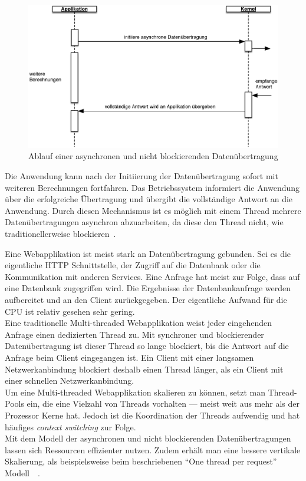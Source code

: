 \begin{figure}[H]
 \centering
 \includegraphics[width=1.0\textwidth]{4-Hauptteil/async-io/async-io.eps}
 \caption{Ablauf einer asynchronen und nicht blockierenden Datenübertragung}
 \label{fig:async-io}
\end{figure}

Die Anwendung kann nach der Initiierung der Datenübertragung sofort mit weiteren Berechnungen fortfahren. Das Betriebssystem informiert die Anwendung über die erfolgreiche Übertragung und übergibt die vollständige Antwort an die Anwendung. Durch diesen Mechanismus ist es möglich mit einem Thread mehrere Datenübertragungen asynchron abzuarbeiten, da diese den Thread nicht, wie traditionellerweise blockieren~\cite{jones_boost_2006}.

\pagebreak

Eine Webapplikation ist meist stark an Datenübertragung gebunden. Sei es die eigentliche HTTP Schnittstelle, der Zugriff auf die Datenbank oder die Kommunikation mit anderen Services. Eine Anfrage hat meist zur Folge, dass auf eine Datenbank zugegriffen wird. Die Ergebnisse der Datenbankanfrage werden aufbereitet und an den Client zurückgegeben. Der eigentliche Aufwand für die CPU ist relativ gesehen sehr gering.\\
Eine traditionelle Multi-threaded Webapplikation weist jeder eingehenden Anfrage einen dedizierten Thread zu. Mit synchroner und blockierender Datenübertragung ist dieser Thread so lange blockiert, bis die Antwort auf die Anfrage beim Client eingegangen ist. Ein Client mit einer langsamen Netzwerkanbindung blockiert deshalb einen Thread länger, als ein Client mit einer schnellen Netzwerkanbindung.\\
Um eine Multi-threaded Webapplikation skalieren zu können, setzt man Thread-Pools ein, die eine Vielzahl von Threads vorhalten --- meist weit aus mehr als der Prozessor Kerne hat. Jedoch ist die Koordination der Threads aufwendig und hat häufiges \textit{context switching} zur Folge.\\
Mit dem Modell der asynchronen und nicht blockierenden Datenübertragungen lassen sich Ressourcen effizienter nutzen. Zudem erhält man eine bessere vertikale Skalierung, als beispielsweise beim beschriebenen \enquote{One thread per request} Modell~\cite[S.~171]{butcher_seven_2014}~\cite[S.~76]{erb_concurrent_2012}.

